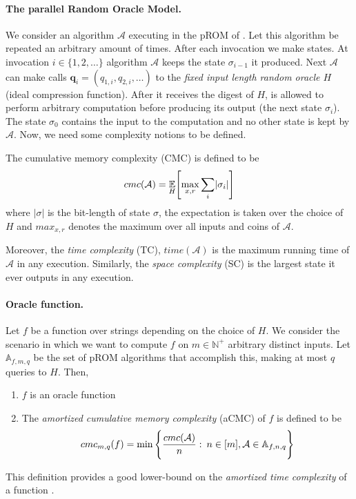\paragraph{The parallel Random Oracle Model.} We consider an algorithm $\mathcal{A}$ executing in the pROM of \cite{Alwen:2015:HPC:2746539.2746622}. Let this algorithm be repeated an arbitrary amount of times. After each invocation we make states. At invocation $i \in \{ 1,2, \dots \}$ algorithm $\mathcal{A}$ keeps the state $\sigma_{i-1}$ it produced. Next $\mathcal{A}$ can make calls $\textbf{q}_i = (q_{1,i}, q_{2,i}, \dots)$
to the \textit{fixed input length random oracle $H$} (ideal compression function). After it receives the digest of $H$, is allowed to perform arbitrary computation before producing its output (the next state $\sigma_i$). The state $\sigma_0$ contains the input to the computation and no other state is kept by $\mathcal{A}$. Now, we need some complexity notions to be defined.

The cumulative memory complexity (CMC) is defined to be
\begin{equation} \nonumber
    cmc(\mathcal{A}) = \underset{H}{\mathbb{E}} \Bigg{[} \underset{x,r}{\max} \sum_{i} \lvert \sigma_i \rvert \Bigg{]}
\end{equation}
where $\lvert \sigma \rvert$ is the bit-length of state $\sigma$, the expectation is taken over the choice of $H$ and $max_{x,r}$ denotes the maximum over all inputs and coins of $\mathcal{A}$.

Moreover, the \textit{time complexity} (TC), $time(\mathcal{A})$ is the maximum running time of $\mathcal{A}$ in any execution. Similarly, the \textit{space complexity} (SC) is the largest state it ever outputs in any execution.

\paragraph{Oracle function.} Let $f$ be a function over strings depending on the choice of $H$. We consider the scenario in which we want to compute $f$ on $m \in \mathbb{N}^{+}$ arbitrary distinct inputs.
Let $\mathbb{A}_{f,m,q}$ be the set of pROM algorithms that accomplish this, making at most $q$ queries to
$H$. Then,

\begin{enumerate}[label=(\alph*)]
  \item $f$ is an oracle function \\

  \item The \textit{amortized cumulative memory complexity} (aCMC) of $f$ is defined to be
  \begin{equation} \nonumber
      cmc_{m,q}(f) = \min \Bigg{\{} \frac{cmc(\mathcal{A})}{n} : \: n \in [m], \mathcal{A} \in \mathbb{A}_{f,n,q} \Bigg{\}}
  \end{equation}
\end{enumerate}
This definition provides a good lower-bound on the \textit{amortized time complexity} of a function \cite{Alwen:2015:HPC:2746539.2746622}.


